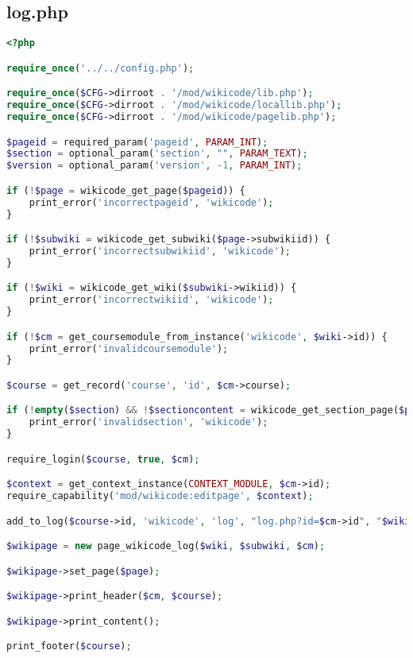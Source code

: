 \subsection{log.php}
\begin{lstlisting}[language=PHP]
<?php

require_once('../../config.php');

require_once($CFG->dirroot . '/mod/wikicode/lib.php');
require_once($CFG->dirroot . '/mod/wikicode/locallib.php');
require_once($CFG->dirroot . '/mod/wikicode/pagelib.php');

$pageid = required_param('pageid', PARAM_INT);
$section = optional_param('section', "", PARAM_TEXT);
$version = optional_param('version', -1, PARAM_INT);

if (!$page = wikicode_get_page($pageid)) {
    print_error('incorrectpageid', 'wikicode');
}

if (!$subwiki = wikicode_get_subwiki($page->subwikiid)) {
    print_error('incorrectsubwikiid', 'wikicode');
}

if (!$wiki = wikicode_get_wiki($subwiki->wikiid)) {
    print_error('incorrectwikiid', 'wikicode');
}

if (!$cm = get_coursemodule_from_instance('wikicode', $wiki->id)) {
    print_error('invalidcoursemodule');
}

$course = get_record('course', 'id', $cm->course);

if (!empty($section) && !$sectioncontent = wikicode_get_section_page($page, $section)) {
    print_error('invalidsection', 'wikicode');
}

require_login($course, true, $cm);

$context = get_context_instance(CONTEXT_MODULE, $cm->id);
require_capability('mod/wikicode:editpage', $context);

add_to_log($course->id, 'wikicode', 'log', "log.php?id=$cm->id", "$wiki->id");

$wikipage = new page_wikicode_log($wiki, $subwiki, $cm);

$wikipage->set_page($page);

$wikipage->print_header($cm, $course);

$wikipage->print_content();

print_footer($course);
\end{lstlisting}


